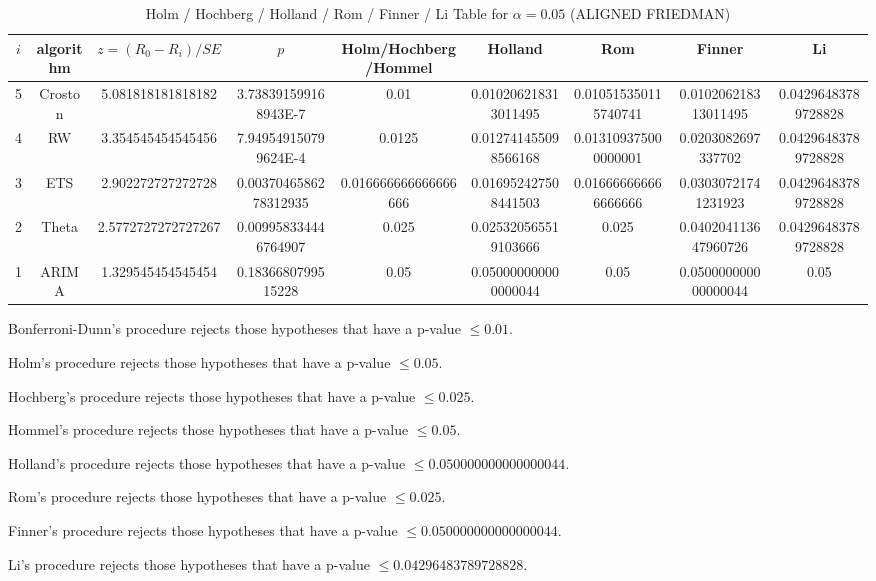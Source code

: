 \documentclass[a4paper,10pt]{article}
\begin{document}
\begin{landscape}
\begin{table}[!htp]
\centering\scriptsize
\caption{Holm / Hochberg / Holland / Rom / Finner / Li Table for $\alpha=0.05$ (ALIGNED FRIEDMAN)}
\begin{tabular}{ccccccccc}
$i$&algorithm&$z=(R_0 - R_i)/SE$&$p$&Holm/Hochberg/Hommel&Holland&Rom&Finner&Li\\
\hline
5&Croston&5.081818181818182&3.738391599168943E-7&0.01&0.010206218313011495&0.010515350115740741&0.010206218313011495&0.04296483789728828\\
4&RW&3.354545454545456&7.949549150799624E-4&0.0125&0.012741455098566168&0.013109375000000001&0.0203082697337702&0.04296483789728828\\
3&ETS&2.902272727272728&0.0037046586278312935&0.016666666666666666&0.016952427508441503&0.016666666666666666&0.03030721741231923&0.04296483789728828\\
2&Theta&2.5772727272727267&0.009958334446764907&0.025&0.025320565519103666&0.025&0.040204113647960726&0.04296483789728828\\
1&ARIMA&1.329545454545454&0.1836680799515228&0.05&0.050000000000000044&0.05&0.050000000000000044&0.05\\
\hline
\end{tabular}
\end{table}
Bonferroni-Dunn's procedure rejects those hypotheses that have a p-value $\le0.01$.


Holm's procedure rejects those hypotheses that have a p-value $\le0.05$.


Hochberg's procedure rejects those hypotheses that have a p-value $\le0.025$.


Hommel's procedure rejects those hypotheses that have a p-value $\le0.05$.


Holland's procedure rejects those hypotheses that have a p-value $\le0.050000000000000044$.


Rom's procedure rejects those hypotheses that have a p-value $\le0.025$.


Finner's procedure rejects those hypotheses that have a p-value $\le0.050000000000000044$.


Li's procedure rejects those hypotheses that have a p-value $\le0.04296483789728828$.



\newpage


\end{landscape}
\end{document}
